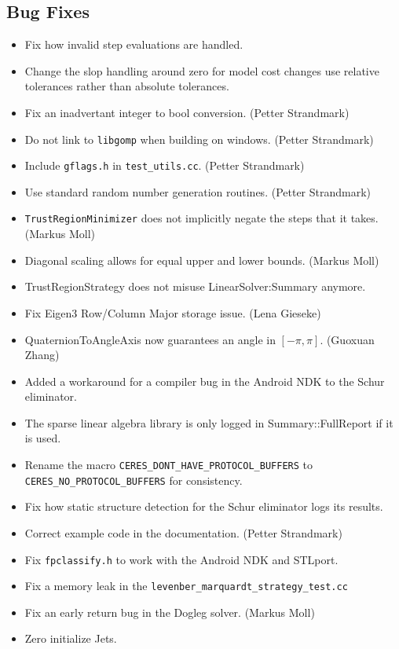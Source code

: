 \subsection{Bug Fixes}
\begin{itemize}
\item Fix how invalid step evaluations are handled.
\item Change the slop handling around zero for model cost changes use
relative tolerances rather than absolute tolerances.
\item Fix an inadvertant integer to bool conversion. (Petter Strandmark)
\item Do not link to \texttt{libgomp} when building on
  windows. (Petter Strandmark)
\item Include \texttt{gflags.h} in \texttt{test\_utils.cc}. (Petter
  Strandmark)
\item Use standard random number generation routines. (Petter Strandmark)
\item \texttt{TrustRegionMinimizer} does not implicitly negate the
  steps that it takes. (Markus Moll)
\item Diagonal scaling allows for equal upper and lower bounds. (Markus Moll)
\item TrustRegionStrategy does not misuse LinearSolver:Summary anymore.
\item Fix Eigen3 Row/Column Major storage issue. (Lena Gieseke)
\item QuaternionToAngleAxis now guarantees an angle in $[-\pi, \pi]$. (Guoxuan Zhang)
\item Added a workaround for a compiler bug in the Android NDK to the
  Schur eliminator.
\item The sparse linear algebra library is only logged in
  Summary::FullReport if it is used.
\item Rename the macro \texttt{CERES\_DONT\_HAVE\_PROTOCOL\_BUFFERS}
  to \texttt{CERES\_NO\_PROTOCOL\_BUFFERS} for consistency.
\item Fix how static structure detection for the Schur eliminator logs
  its results.
\item Correct example code in the documentation. (Petter Strandmark)
\item Fix \texttt{fpclassify.h} to work with the Android NDK and STLport.
\item Fix a memory leak in the \texttt{levenber\_marquardt\_strategy\_test.cc}
\item Fix an early return bug in the Dogleg solver. (Markus Moll)
\item Zero initialize Jets.

\end{itemize}
